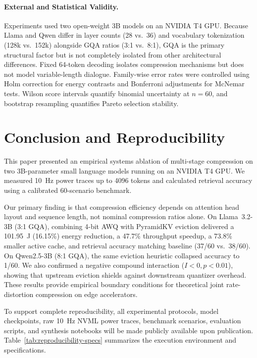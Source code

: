 \documentclass[sigconf,nonacm]{acmart}
\begin{document}
\paragraph{External and Statistical Validity.} Experiments used two open-weight 3B models on an NVIDIA T4 GPU. Because Llama and Qwen differ in layer counts (28 vs.\ 36) and vocabulary tokenization (128k vs.\ 152k) alongside GQA ratios (3:1 vs.\ 8:1), GQA is the primary structural factor but is not completely isolated from other architectural differences. Fixed 64-token decoding isolates compression mechanisms but does not model variable-length dialogue. Family-wise error rates were controlled using Holm correction for energy contrasts and Bonferroni adjustments for McNemar tests. Wilson score intervals quantify binomial uncertainty at $n=60$, and bootstrap resampling quantifies Pareto selection stability.

\section{Conclusion and Reproducibility}

This paper presented an empirical systems ablation of multi-stage compression on two 3B-parameter small language models running on an NVIDIA T4 GPU. We measured 10~Hz power traces up to 4096 tokens and calculated retrieval accuracy using a calibrated 60-scenario benchmark.

Our primary finding is that compression efficiency depends on attention head layout and sequence length, not nominal compression ratios alone. On Llama~3.2-3B (3:1 GQA), combining 4-bit AWQ with PyramidKV eviction delivered a 101.95~J (16.15\%) energy reduction, a 47.7\% throughput speedup, a 73.8\% smaller active cache, and retrieval accuracy matching baseline (37/60 vs.\ 38/60). On Qwen2.5-3B (8:1 GQA), the same eviction heuristic collapsed accuracy to 1/60. We also confirmed a negative compound interaction ($I < 0, p < 0.01$), showing that upstream eviction shields against downstream quantizer overhead. These results provide empirical boundary conditions for theoretical joint rate-distortion compression on edge accelerators.

To support complete reproducibility, all experimental protocols, model checkpoints, raw 10~Hz NVML power traces, benchmark scenarios, evaluation scripts, and synthesis notebooks will be made publicly available upon publication. Table~\ref{tab:reproducibility-specs} summarizes the execution environment and specifications.
\end{document}
